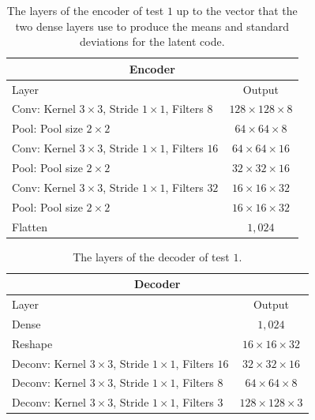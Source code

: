 \begin{center}
    \begin{table}[H] 
        \centering
        \begin{tabular}{ | l | c | }
            \multicolumn{2}{c}{Encoder} \\ \hline
            Layer & Output\\ \hline
            Conv: Kernel $3\times3$, Stride $1\times1$, Filters $8  $    & $128\times 128\times 8  $    \\
            Pool: Pool size $2\times2$                                   & $64\times 64\times 8  $  \\
            Conv: Kernel $3\times3$, Stride $1\times1$, Filters $16 $    & $64\times 64\times 16 $    \\
            Pool: Pool size $2\times2$                                   & $32\times 32\times 16  $  \\
            Conv: Kernel $3\times3$, Stride $1\times1$, Filters $32 $    & $16\times 16\times 32 $    \\
            Pool: Pool size $2\times2$                                   & $16\times 16\times 32  $  \\
            Flatten                                                              & $1,024$            \\
            \hline
        \end{tabular} 
        \caption{The layers of the encoder of test $1$ up to the vector that the two dense layers use to produce 
        the means and standard deviations for the latent code.} \label{table_encoder_pooling}
    \end{table}
\end{center}
\vspace{-4em}
\begin{center}
    \begin{table}[H]
        \centering
        \begin{tabular}{ | l | c | }
            \multicolumn{2}{c}{Decoder} \\ \hline
            Layer & Output\\ \hline
            Dense                                                            & $1,024$                   \\
            Reshape                                                          & $16\times 16\times  32 $  \\
            Deconv: Kernel $3\times3$, Stride $1\times1$, Filters $16 $      & $32\times 32\times  16 $  \\
            Deconv: Kernel $3\times3$, Stride $1\times1$, Filters $8  $      & $64\times 64\times  8  $  \\
            Deconv: Kernel $3\times3$, Stride $1\times1$, Filters $3  $      & $128\times 128\times3  $  \\
            \hline
        \end{tabular} 
        \caption{The layers of the decoder of test $1$.}
    \end{table}
\end{center}

